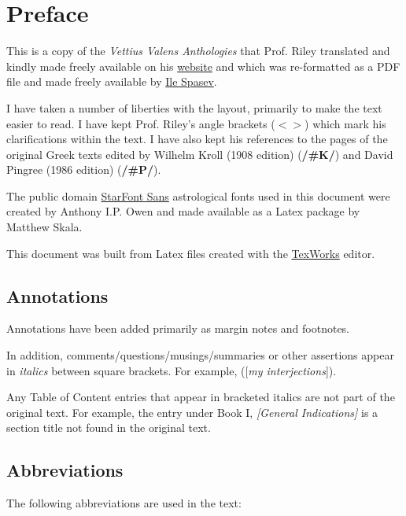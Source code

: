 \chapter{Preface}
This is a copy of the \textit{Vettius Valens Anthologies} that Prof. Riley translated and kindly made freely available on his \href{https://www.csus.edu/indiv/r/rileymt/}{website} and which was re-formatted as a PDF file and made freely available by \href{https://beyondtheheaven.files.wordpress.com/2019/02/valens-atnhologies-1st-ed.-green.pdf}{Ile Spasev}.

I have taken a number of liberties with the layout, primarily to make the text easier to read. I have kept Prof. Riley's angle brackets ($< >$) which mark his clarifications within the text. I have also kept his references to the pages of the original Greek texts edited by Wilhelm Kroll (1908 edition) (\textbf{/\#K/}) and David Pingree (1986 edition) (\textbf{/\#P/}). 

The public domain \href{https://www.ctan.org/pkg/starfont}{StarFont Sans} astrological fonts used in this document were created by Anthony I.P. Owen and made available as a Latex package by Matthew Skala. 

This document was built from Latex files created with the \href{https://www.tug.org/texworks/}{TexWorks} editor.

\section{Annotations}

Annotations have been added primarily as margin notes and footnotes. 

In addition, comments/questions/musings/summaries or other assertions appear in \textit{italics} between square brackets. For example, ([\textit{my interjections}]). 

Any Table of Content entries that appear in bracketed italics are not part of the original text. For example, the entry under Book I, \textit{[General Indications]} is a section title not found in the original text.

\section{Abbreviations}
The following abbreviations are used in the text:

